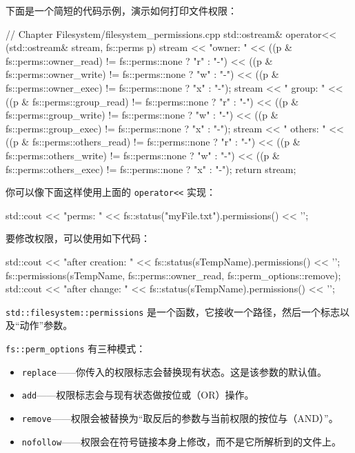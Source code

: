 下面是一个简短的代码示例，演示如何打印文件权限：

\begin{codebox}[cpp]
// Chapter Filesystem/filesystem_permissions.cpp
std::ostream& operator<< (std::ostream& stream, fs::perms p)
{
    stream << "owner: "
           << ((p & fs::perms::owner_read)
               != fs::perms::none ? "r" : "-")
           << ((p & fs::perms::owner_write) != fs::perms::none ? "w" : "-")
           << ((p & fs::perms::owner_exec)
               != fs::perms::none ? "x" : "-");
    stream << " group: "
           << ((p & fs::perms::group_read)
               != fs::perms::none ? "r" : "-")
           << ((p & fs::perms::group_write) != fs::perms::none ? "w" : "-")
           << ((p & fs::perms::group_exec)
               != fs::perms::none ? "x" : "-");
    stream << " others: "
           << ((p & fs::perms::others_read)
               != fs::perms::none ? "r" : "-")
           << ((p & fs::perms::others_write) != fs::perms::none ? "w" : "-")
           << ((p & fs::perms::others_exec)
               != fs::perms::none ? "x" : "-");
    return stream;
}
\end{codebox}

你可以像下面这样使用上面的 \texttt{operator<<} 实现：

\begin{codebox}[cpp]
std::cout << "perms: " << fs::status("myFile.txt").permissions() << '\n';
\end{codebox}


要修改权限，可以使用如下代码：

\begin{codebox}[cpp]
std::cout << "after creation: " << fs::status(sTempName).permissions() << '\n';
fs::permissions(sTempName, fs::perms::owner_read, fs::perm_options::remove);
std::cout << "after change: " << fs::status(sTempName).permissions() << '\n';
\end{codebox}

\texttt{std::filesystem::permissions} 是一个函数，它接收一个路径，然后一个标志以及“动作”参数。

\texttt{fs::perm\_options} 有三种模式：

\begin{itemize}
\item \texttt{replace}——你传入的权限标志会替换现有状态。这是该参数的默认值。
\item \texttt{add}——权限标志会与现有状态做按位或（OR）操作。
\item \texttt{remove}——权限会被替换为“取反后的参数与当前权限的按位与（AND）”。
\item \texttt{nofollow}——权限会在符号链接本身上修改，而不是它所解析到的文件上。
\end{itemize}


